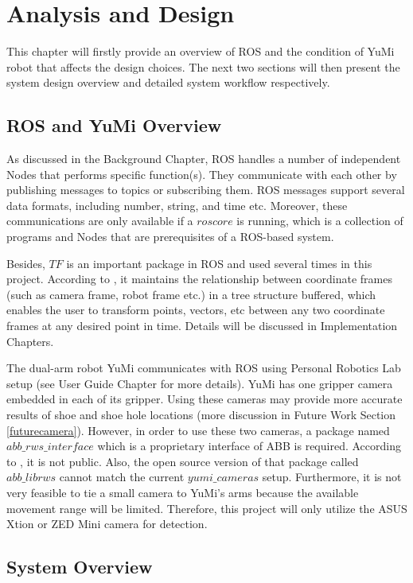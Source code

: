 \chapter{Analysis and Design}

This chapter will firstly provide an overview of ROS and the condition of YuMi robot that affects the design choices. The next two sections will then present the system design overview and detailed system workflow respectively.

\section{ROS and YuMi Overview}
As discussed in the Background Chapter, ROS handles a number of independent Nodes that performs specific function(s). They communicate with each other by publishing messages to topics or subscribing them. ROS messages support several data formats, including number, string, and time etc. Moreover, these communications are only available if a $roscore$ is running, which is a collection of programs and Nodes that are prerequisites of a ROS-based system.

Besides, $TF$ is an important package in ROS and used several times in this project. According to \citep{tfROSWik}, it maintains the relationship between coordinate frames (such as camera frame, robot frame etc.) in a tree structure buffered, which enables the user to transform points, vectors, etc between any two coordinate frames at any desired point in time. Details will be discussed in Implementation Chapters.

The dual-arm robot YuMi communicates with ROS using Personal Robotics Lab setup (see User Guide Chapter for more details). YuMi has one gripper camera embedded in each of its gripper. Using these cameras may provide more accurate results of shoe and shoe hole locations (more discussion in Future Work Section \ref{futurecamera}). However, in order to use these two cameras, a package named $abb\_rws\_interface$ which is a proprietary interface of ABB is required. According to \citep{EGMfiles}, it is not public. Also, the open source version of that package called $abb\_librws$ cannot match the current $yumi\_cameras$ setup. Furthermore, it is not very feasible to tie a small camera to YuMi's arms because the available movement range will be limited. Therefore, this project will only utilize the ASUS Xtion or ZED Mini camera for detection.

\section{System Overview}

